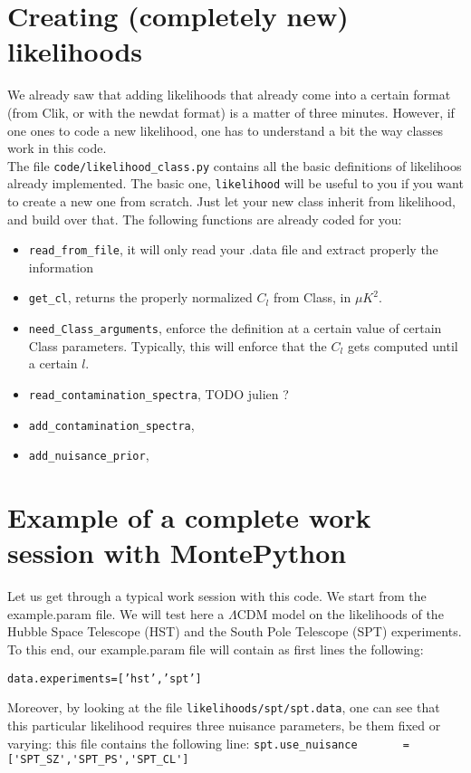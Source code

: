 \documentclass[10pt]{article}
\begin{document}
\section{Creating (completely new) likelihoods}

  We already saw that adding likelihoods that already come into a certain format
  (from Clik, or with the newdat format) is a matter of three minutes. However,
  if one ones to code a new likelihood, one has to understand a bit the way
  classes work in this code.\\

  The file \verb?code/likelihood_class.py? contains all the basic definitions
  of likelihoos already implemented. The basic one, \verb?likelihood? will be
  useful to you if you want to create a new one from scratch. Just let your new
  class inherit from likelihood, and build over that. The following functions are already coded for you:\\

  \begin{itemize}
    \item \verb?read_from_file?, it will only read your .data file and extract
      properly the information
    \item \verb?get_cl?, returns the properly normalized $C_l$ from Class, in $\mu K^2$.
    \item \verb?need_Class_arguments?, enforce the definition at a certain
      value of certain Class parameters. Typically, this will enforce that the
      $C_l$ gets computed until a certain $l$.
    \item \verb?read_contamination_spectra?, TODO julien ?
    \item \verb?add_contamination_spectra?,
    \item \verb?add_nuisance_prior?,
  \end{itemize}


  \newpage
  \section{Example of a complete work session with MontePython}
  Let us get through a typical work session with this code. We start from the
  example.param file. We will test here a $\Lambda$CDM model on the likelihoods
  of the Hubble Space Telescope (HST) and the South Pole Telescope (SPT)
  experiments.\\

  To this end, our example.param file will contain as first lines the following:
  
  \begin{alltt}
    data.experiments = ['hst','spt']
  \end{alltt}

  Moreover, by looking at the file \verb?likelihoods/spt/spt.data?, one can see
  that this particular likelihood requires three nuisance parameters, be them
  fixed or varying: this file contains the following line:
  \verb?spt.use_nuisance	   = ['SPT_SZ','SPT_PS','SPT_CL']?
\end{document}
